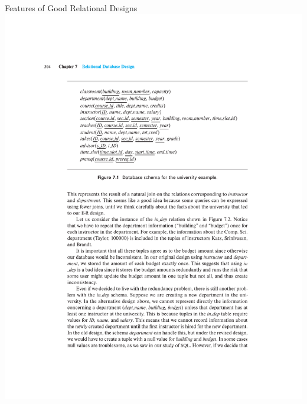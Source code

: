 \documentclass{beamer}
\begin{document}
\begin{frame}{Features of Good Relational Designs}
    \centering
    \includegraphics[width=\textwidth, trim={5cm 15.75cm 4cm 4.75cm}, clip]{figures/p304_schema}
\end{frame}
\end{document}
